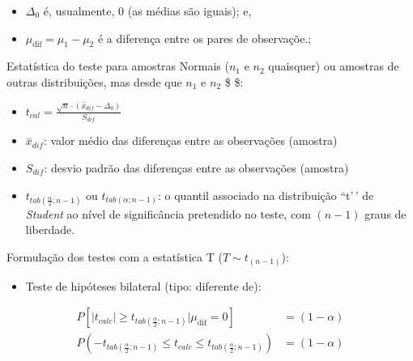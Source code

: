 \documentclass[
]{book}
\providecommand{\tightlist}{%
  \setlength{\itemsep}{0pt}\setlength{\parskip}{0pt}}
\begin{document}
\begin{itemize}
\tightlist
\item
  \(\Delta_{0}\) é, usualmente, 0 (as médias são iguais); e,\\
\item
  \(\mu_{\text{dif}} = \mu_{1} - \mu_{2}\) é a diferença entre os pares de observaçõe.;
\end{itemize}

\hfill\break

Estatística do teste para amostras Normais (\(n_{1}\) e \(n_{2}\) quaisquer) ou amostras de outras distribuições, mas desde que \(n_{1}\) e \(n_{2}\) \$ \$:

\hfill\break

\begin{itemize}
\tightlist
\item
  \(t_{cal} = \frac{\sqrt{n}\cdot \left({\stackrel{-}{x}}_{dif}-{\Delta }_{0}\right)}{{S}_{dif}}\)
\item
  \(\stackrel{-}{x}_{dif}\): valor médio das diferenças entre as observações (amostra)
\item
  \(S_{dif}\): desvio padrão das diferenças entre as observações (amostra)
\item
  \({t}_{tab\left(\frac{\alpha }{2}; n-1 \right)}\) ou \({t}_{tab\left(\alpha ; n-1\right)}\): o quantil associado na distribuição ``t'\,' de \emph{Student} ao nível de significância pretendido no teste, com \((n-1)\) graus de liberdade.
\end{itemize}

\hfill\break

Formulação dos testes com a estatística T (\(T \sim t_{(n-1)}\)):

\hfill\break

\begin{itemize}
\tightlist
\item
  Teste de hipóteses bilateral (tipo: diferente de):
\end{itemize}

\hfill\break

\begin{align*}
P[\left|t_{calc}\right| \ge {t}_{tab\left(\frac{\alpha }{2}; n-1 \right)}|\mu_{\text{dif}}=0] & =(1-\alpha)\\
P ( - {t}_{tab\left(\frac{\alpha }{2}; n-1 \right)}   \le t_{calc}  \le {t}_{tab\left(\frac{\alpha }{2}; n-1 \right)}) & = (1-\alpha)\\
\end{align*}
\end{document}
